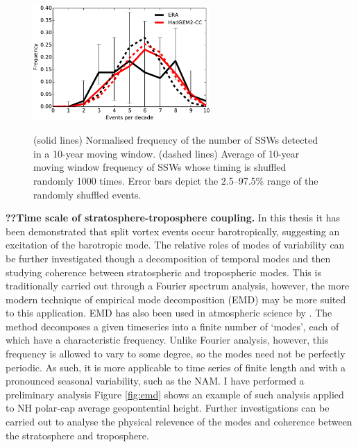 \begin{figure}[t]
  \centering
  \noindent\includegraphics[width=0.6\textwidth,angle=0]{figures/chapter-conclusions/events_decadal.pdf}\\
  \caption[Decadal variability of SSWs]{(solid lines) Normalised frequency of
    the number of SSWs detected in a 10-year moving window. (dashed lines)
    Average of 10-year moving window frequency of SSWs whose timing is shuffled
    randomly 1000 times. Error bars depict the 2.5--97.5\%
    range of the randomly shuffled events.}\label{fig:decadal}
\end{figure}



\bigskip\noindent\textbf{??Time scale of stratosphere-troposphere coupling.} In
this thesis it has been demonstrated that split vortex events occur
barotropically, suggesting an excitation of the barotropic mode. The relative
roles of modes of variability can be further investigated though a decomposition
of temporal modes and then studying coherence between stratospheric and
tropospheric modes. This is traditionally carried out through a Fourier spectrum
analysis, however, the more modern technique of empirical mode decomposition
(EMD) \citep{Huang1998} may be more suited to this application. EMD has also
been used in atmospheric science by \citet{Coughlin2004}. The method decomposes
a given timeseries into a finite number of `modes', each of which have a
characteristic frequency. Unlike Fourier analysis, however, this frequency is
allowed to vary to some degree, so the modes need not be perfectly periodic. As
such, it is more applicable to time series of finite length and with a
pronounced seasonal variability, such as the NAM. I have performed a preliminary
analysis Figure \ref{fig:emd} shows an example of such analysis applied to NH
polar-cap average geopontential height. Further investigations can be carried
out to analyse the physical relevence of the modes and coherence between the
stratosphere and troposphere.

